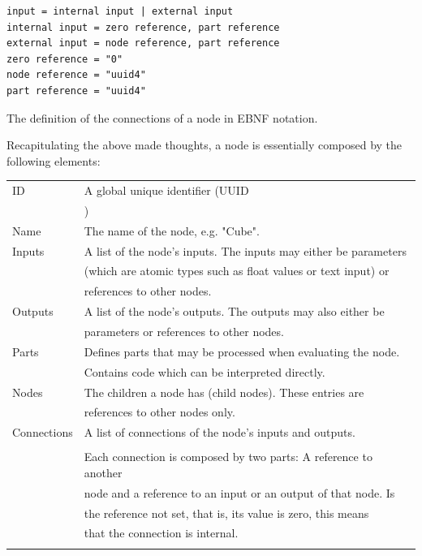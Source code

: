 \documentclass[10pt, openright, notitlepage]{scrreprt}
\begin{document}
\begin{listing}[H]
\begin{verbatim}
input = internal input | external input
internal input = zero reference, part reference
external input = node reference, part reference
zero reference = "0"
node reference = "uuid4"
part reference = "uuid4"
\end{verbatim}
\caption{\label{node-connections-ebnf}
The definition of the connections of a node in EBNF notation.}
\end{listing}

Recapitulating the above made thoughts, a node is essentially composed by the
following elements:


\begin{center}
\begin{tabular}{ll}
ID & A global unique identifier (UUID\\
 & \footnotemark)\\
\hline
Name & The name of the node, e.g. "Cube".\\
\hline
Inputs & A list of the node's inputs. The inputs may either be parameters\\
 & (which are atomic types such as float values or text input) or\\
 & references to other nodes.\\
\hline
Outputs & A list of the node's outputs. The outputs may also either be\\
 & parameters or references to other nodes.\\
\hline
Parts & Defines parts that may be processed when evaluating the node.\\
 & Contains code which can be interpreted directly.\\
\hline
Nodes & The children a node has (child nodes). These entries are\\
 & references to other nodes only.\\
\hline
Connections & A list of connections of the node's inputs and outputs.\\
 & \\
 & Each connection is composed by two parts: A reference to another\\
 & node and a reference to an input or an output of that node. Is\\
 & the reference not set, that is, its value is zero, this means\\
 & that the connection is internal.\\
 & \\
\end{tabular}
\end{center}
\end{document}
